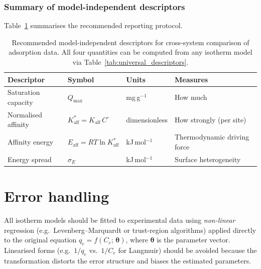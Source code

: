 \documentclass[12pt]{article}
\begin{document}
	\subsubsection{Summary of model-independent descriptors}

	Table~\ref{tab:comparison_protocol} summarises the recommended
	reporting protocol.

	\begin{table}[htbp]
		\centering
		\small
		\caption{Recommended model-independent descriptors for
			cross-system comparison of adsorption data.  All four
			quantities can be computed from any isotherm model via
			Table~\ref{tab:universal_descriptors}.}
		\label{tab:comparison_protocol}
		\renewcommand{\arraystretch}{1.4}
		\begin{tabular}{llll}
			\hline
			\textbf{Descriptor}
			& \textbf{Symbol}
			& \textbf{Units}
			& \textbf{Measures}
			\\
			\hline
			Saturation capacity
			& $Q_{\max}$
			& mg\,g$^{-1}$
			& How much
			\\
			Normalised affinity
			& $K_{\mathrm{aff}}^{\ast}
			= K_{\mathrm{aff}}\,C^\circ$
			& dimensionless
			& How strongly (per site)
			\\
			Affinity energy
			& $E_{\mathrm{aff}}
			= RT\ln K_{\mathrm{aff}}^{\ast}$
			& kJ\,mol$^{-1}$
			& Thermodynamic driving force
			\\
			Energy spread
			& $\sigma_E$
			& kJ\,mol$^{-1}$
			& Surface heterogeneity
			\\
			\hline
		\end{tabular}
	\end{table}

	\noindent{}

	\section{Error handling}

	All isotherm models should be fitted to experimental data using
	\emph{non-linear} regression (e.g.\ Levenberg--Marquardt or
	trust-region algorithms) applied directly to the original equation
	$q_e = f(C_e;\,\boldsymbol{\theta})$, where
	$\boldsymbol{\theta}$ is the parameter vector.
	Linearised forms (e.g.\ $1/q_e$ vs.\ $1/C_e$ for Langmuir) should
	be avoided because the transformation distorts the error structure
	and biases the estimated parameters.
\end{document}
